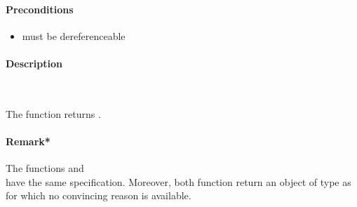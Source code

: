 \paragraph{Preconditions}
\begin{itemize}
    \item  {} must be dereferenceable
\end{itemize}

\paragraph{Description}~

The function  returns .

\paragraph{Remark*}
The functions \peekfinish and\\
\pokefinish have the same specification.
Moreover, both function return an object of type  as 
for which no convincing reason is available.





